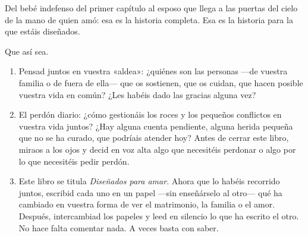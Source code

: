 Del bebé indefenso del primer capítulo al esposo que llega a las puertas del cielo de la mano de quien amó: esa es la historia completa. Esa es la historia para la que estáis diseñados.

Que así sea.

\paracaminar

\begin{enumerate}
  \item Pensad juntos en vuestra «aldea»: ¿quiénes son las personas ---de vuestra familia o de fuera de ella--- que os sostienen, que os cuidan, que hacen posible vuestra vida en común? ¿Les habéis dado las gracias alguna vez?

  \item El perdón diario: ¿cómo gestionáis los roces y los pequeños conflictos en vuestra vida juntos? ¿Hay alguna cuenta pendiente, alguna herida pequeña que no se ha curado, que podríais atender hoy? Antes de cerrar este libro, miraos a los ojos y decid en voz alta algo que necesitéis perdonar o algo por lo que necesitéis pedir perdón.

  \item Este libro se titula \textit{Diseñados para amar}. Ahora que lo habéis recorrido juntos, escribid cada uno en un papel ---sin enseñárselo al otro--- qué ha cambiado en vuestra forma de ver el matrimonio, la familia o el amor. Después, intercambiad los papeles y leed en silencio lo que ha escrito el otro. No hace falta comentar nada. A veces basta con saber.
\end{enumerate}

